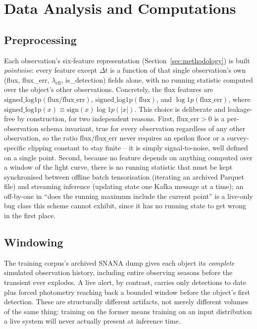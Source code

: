 \section{Data Analysis and Computations}
\label{sec:analysis}

\subsection{Preprocessing}

Each observation's six-feature representation (Section~\ref{sec:methodology})
is built \emph{pointwise}: every feature except $\Delta t$ is a function of
that single observation's own (flux, flux\_err, $\lambda_\mathrm{eff}$,
is\_detection) fields alone, with no running statistic computed over the
object's other observations. Concretely, the flux features are
$\mathrm{signed\_log1p}(\mathrm{flux}/\mathrm{flux\_err})$,
$\mathrm{signed\_log1p}(\mathrm{flux})$, and $\log1p(\mathrm{flux\_err})$,
where $\mathrm{signed\_log1p}(x) \equiv \mathrm{sign}(x)\log1p(|x|)$. This
choice is deliberate and leakage-free by construction, for two independent
reasons. First, $\mathrm{flux\_err} > 0$ is a per-observation schema
invariant, true for every observation regardless of any other observation,
so the ratio $\mathrm{flux}/\mathrm{flux\_err}$ never requires an epsilon
floor or a survey-specific clipping constant to stay finite -- it is simply
signal-to-noise, well defined on a single point. Second, because no feature
depends on anything computed over a window of the light curve, there is no
running statistic that must be kept synchronised between offline batch
tensorisation (iterating an archived Parquet file) and streaming inference
(updating state one Kafka message at a time); an off-by-one in ``does the
running maximum include the current point'' is a live-only bug class this
scheme cannot exhibit, since it has no running state to get wrong in the
first place.

\subsection{Windowing}
\label{sec:windowing}

The training corpus's archived SNANA dump gives each object its
\emph{complete} simulated observation history, including entire observing
seasons before the transient ever explodes. A live alert, by contrast,
carries only detections to date plus forced photometry reaching back a
bounded window before the object's first detection. These are structurally
different artifacts, not merely different volumes of the same thing:
training on the former means training on an input distribution a live
system will never actually present at inference time.

